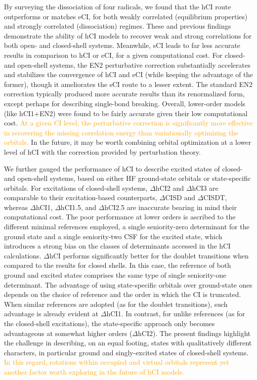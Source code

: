 \documentclass[aip,jcp,reprint,noshowkeys,superscriptaddress]{revtex4-1}
\newcommand{\fk}[1]{\textcolor{orange}{#1}}
\begin{document}
By surveying the dissociation of four radicals,
we found that the hCI route outperforms or matches eCI, for both weakly correlated (equilibrium properties) and strongly correlated (dissociation) regimes.
These and previous \cite{Kossoski_2022} findings demonstrate the ability of hCI models to recover weak and strong correlations for both open- and closed-shell systems.
Meanwhile, sCI leads to far less accurate results in comparison to hCI or eCI, for a given computational cost.
For closed- and open-shell systems, the EN2 perturbative correction
substantially accelerates and stabilizes the convergence of hCI and eCI (while keeping the advantage of the former),
though it ameliorates the sCI route to a lesser extent.
The standard EN2 correction typically produced more accurate results than its renormalized form, except perhaps for describing single-bond breaking.
Overall, lower-order models (like hCI1+EN2) were found to be fairly accurate given their low computational cost.
\fk{At a given CI level, the perturbative correction is significantly more effective in recovering the missing correlation energy than variationally optimizing the orbitals. \cite{Kossoski_2022}}
In the future, it may be worth combining orbital optimization at a lower level of hCI \cite{Kossoski_2022} with the correction provided by perturbation theory.

We further gauged the performance of hCI to describe excited states of closed- and open-shell systems, based on either HF ground-state orbitals or state-specific orbitals.
For excitations of closed-shell systems, $\Delta$hCI2 and $\Delta$hCI3 are comparable to their excitation-based counterparts, $\Delta$CISD and $\Delta$CISDT,
whereas $\Delta$hCI1, $\Delta$hCI1.5, and $\Delta$hCI2.5 are inaccurate bearing in mind their computational cost.
The poor performance at lower orders is ascribed to the different minimal references employed,
a single seniority-zero determinant for the ground state and a single seniority-two CSF for the excited state,
which introduces a strong bias on the classes of determinants accessed in the hCI calculations.
$\Delta$hCI performs significantly better for the doublet transitions when compared to the results for closed shells.
In this case, the reference of both ground and excited states comprises the same type of single seniority-one determinant.
The advantage of using state-specific orbitals over ground-state ones depends on the choice of reference and the order in which the CI is truncated.
When similar references are adopted (as for the doublet transitions), such advantage is already evident at $\Delta$hCI1.
In contrast, for unlike references (as for the closed-shell excitations), the state-specific approach only becomes advantageous at somewhat higher orders ($\Delta$hCI2).
The present findings highlight the challenge in describing, on an equal footing, states with qualitatively different characters, in particular ground and singly-excited states of closed-shell systems.
\fk{In this regard, rotations within occupied and virtual orbitals represent yet another factor worth exploring in the future of hCI models.}
\end{document}
